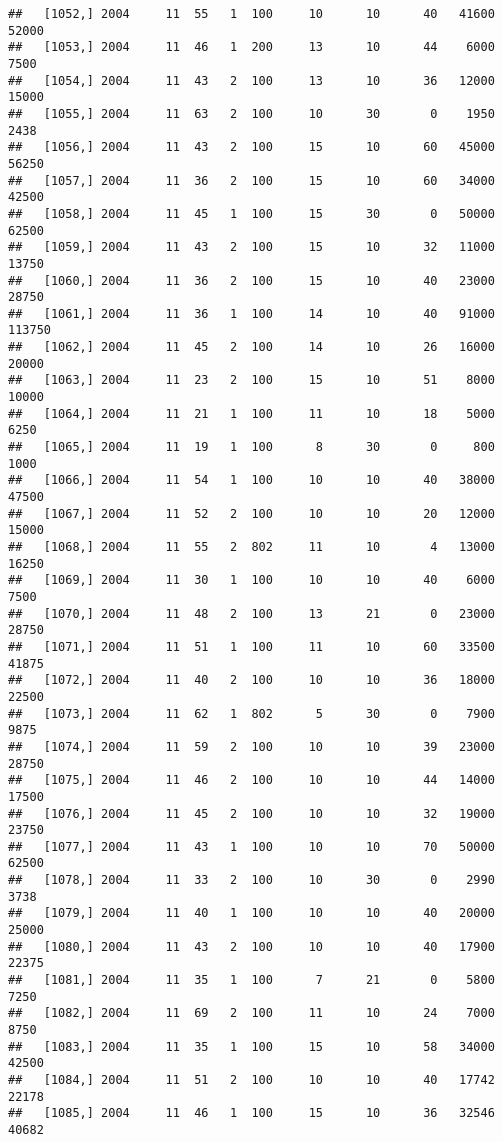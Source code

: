 \documentclass{article}\usepackage[]{graphicx}\usepackage[]{color}
\makeatletter
\newenvironment{kframe}{%
 \def\at@end@of@kframe{}%
 \ifinner\ifhmode%
  \def\at@end@of@kframe{\end{minipage}}%
  \begin{minipage}{\columnwidth}%
 \fi\fi%
 \def\FrameCommand##1{\hskip\@totalleftmargin \hskip-\fboxsep
 \colorbox{shadecolor}{##1}\hskip-\fboxsep
     \hskip-\linewidth \hskip-\@totalleftmargin \hskip\columnwidth}%
 \MakeFramed {\advance\hsize-\width
   \@totalleftmargin\z@ \linewidth\hsize
   \@setminipage}}%
 {\par\unskip\endMakeFramed%
 \at@end@of@kframe}
\newenvironment{knitrout}{}{} %
\makeatother
\begin{document}
\begin{knitrout}
\begin{kframe}
\begin{verbatim}
##   [1052,] 2004     11  55   1  100     10      10      40   41600   52000
##   [1053,] 2004     11  46   1  200     13      10      44    6000    7500
##   [1054,] 2004     11  43   2  100     13      10      36   12000   15000
##   [1055,] 2004     11  63   2  100     10      30       0    1950    2438
##   [1056,] 2004     11  43   2  100     15      10      60   45000   56250
##   [1057,] 2004     11  36   2  100     15      10      60   34000   42500
##   [1058,] 2004     11  45   1  100     15      30       0   50000   62500
##   [1059,] 2004     11  43   2  100     15      10      32   11000   13750
##   [1060,] 2004     11  36   2  100     15      10      40   23000   28750
##   [1061,] 2004     11  36   1  100     14      10      40   91000  113750
##   [1062,] 2004     11  45   2  100     14      10      26   16000   20000
##   [1063,] 2004     11  23   2  100     15      10      51    8000   10000
##   [1064,] 2004     11  21   1  100     11      10      18    5000    6250
##   [1065,] 2004     11  19   1  100      8      30       0     800    1000
##   [1066,] 2004     11  54   1  100     10      10      40   38000   47500
##   [1067,] 2004     11  52   2  100     10      10      20   12000   15000
##   [1068,] 2004     11  55   2  802     11      10       4   13000   16250
##   [1069,] 2004     11  30   1  100     10      10      40    6000    7500
##   [1070,] 2004     11  48   2  100     13      21       0   23000   28750
##   [1071,] 2004     11  51   1  100     11      10      60   33500   41875
##   [1072,] 2004     11  40   2  100     10      10      36   18000   22500
##   [1073,] 2004     11  62   1  802      5      30       0    7900    9875
##   [1074,] 2004     11  59   2  100     10      10      39   23000   28750
##   [1075,] 2004     11  46   2  100     10      10      44   14000   17500
##   [1076,] 2004     11  45   2  100     10      10      32   19000   23750
##   [1077,] 2004     11  43   1  100     10      10      70   50000   62500
##   [1078,] 2004     11  33   2  100     10      30       0    2990    3738
##   [1079,] 2004     11  40   1  100     10      10      40   20000   25000
##   [1080,] 2004     11  43   2  100     10      10      40   17900   22375
##   [1081,] 2004     11  35   1  100      7      21       0    5800    7250
##   [1082,] 2004     11  69   2  100     11      10      24    7000    8750
##   [1083,] 2004     11  35   1  100     15      10      58   34000   42500
##   [1084,] 2004     11  51   2  100     10      10      40   17742   22178
##   [1085,] 2004     11  46   1  100     15      10      36   32546   40682

\end{verbatim}
\end{kframe}
\end{knitrout}
\end{document}
